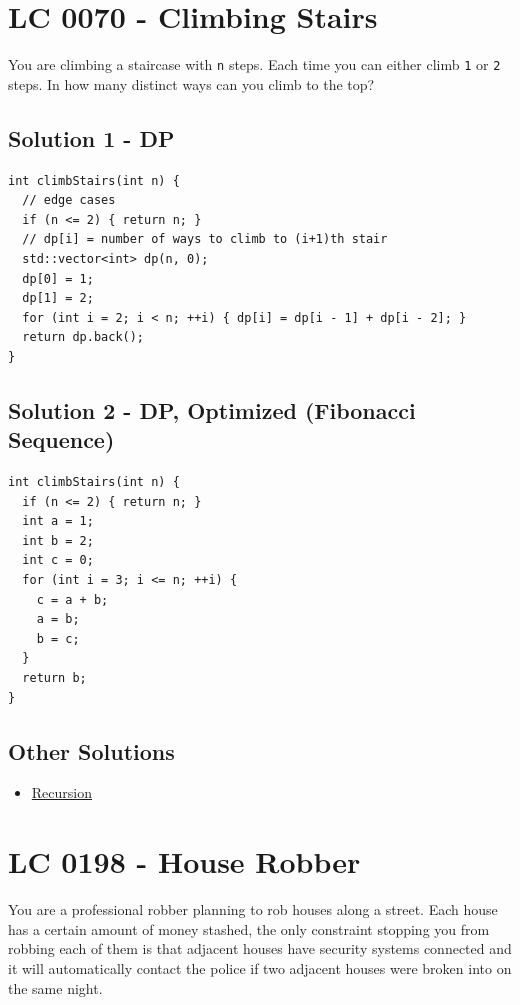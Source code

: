 \section{LC 0070 - Climbing Stairs}
You are climbing a staircase with {\colorbox{CodeBackground}{\lstinline|n|}} steps. Each time you can either climb {\colorbox{CodeBackground}{\lstinline|1|}} or {\colorbox{CodeBackground}{\lstinline|2|}} steps. In how many distinct ways can you climb to the top?

\subsection*{Solution 1 - DP}\label{solution:lc0070_dp}
\begin{lstlisting}
int climbStairs(int n) {
  // edge cases
  if (n <= 2) { return n; }
  // dp[i] = number of ways to climb to (i+1)th stair
  std::vector<int> dp(n, 0);
  dp[0] = 1;
  dp[1] = 2;
  for (int i = 2; i < n; ++i) { dp[i] = dp[i - 1] + dp[i - 2]; }
  return dp.back();
}
\end{lstlisting}

\subsection*{Solution 2 - DP, Optimized (Fibonacci Sequence)}\label{solution:lc0070_fibonacci_sequence}
\begin{lstlisting}
int climbStairs(int n) {
  if (n <= 2) { return n; }
  int a = 1;
  int b = 2;
  int c = 0;
  for (int i = 3; i <= n; ++i) {
    c = a + b;
    a = b;
    b = c;
  }
  return b;
}
\end{lstlisting}

\subsection*{Other Solutions}
\begin{itemize}
\item \hyperref[solution:lc0070_recursion]{Recursion}
\end{itemize}

\section{LC 0198 - House Robber}\label{lc0198}
You are a professional robber planning to rob houses along a street. Each house has a certain amount of money stashed, the only constraint stopping you from robbing each of them is that adjacent houses have security systems connected and it will automatically contact the police if two adjacent houses were broken into on the same night.\\

